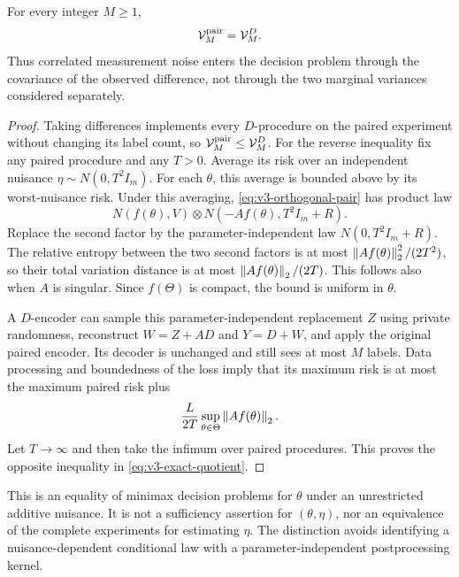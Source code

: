 \begin{theorem}
\label{thm:v3-quotient}
For every integer $M\ge1$,
\begin{equation}\label{eq:v3-exact-quotient}
 \mathcal V_M^{\rm pair}=\mathcal V_M^D.
\end{equation}
Thus correlated measurement noise enters the decision problem through the
covariance of the observed difference, not through the two marginal
variances considered separately.
\end{theorem}
\begin{proof}
Taking differences implements every $D$-procedure on the paired experiment
without changing its label count, so
$\mathcal V_M^{\rm pair}\le\mathcal V_M^D$.
For the reverse inequality fix any paired procedure and any $T>0$.
Average its risk over an independent nuisance
$\eta\sim N(0,T^2I_m)$. For each $\theta$, this average is bounded
above by its worst-nuisance risk. Under this averaging,
\eqref{eq:v3-orthogonal-pair} has product law
\[
 N(f(\theta),V)\otimes N(-Af(\theta),T^2I_m+R).
\]
Replace the second factor by the parameter-independent law
$N(0,T^2I_m+R)$. The relative entropy between the two second factors
is at most $\left\lVert Af(\theta)\right\rVert_2^2/(2T^2)$, so their total variation
distance is at most $\left\lVert Af(\theta)\right\rVert_2/(2T)$. This follows also
when $A$ is singular. Since $f(\Theta)$ is compact, the bound is
uniform in $\theta$.

A $D$-encoder can sample this parameter-independent replacement $Z$
using private randomness, reconstruct $W=Z+AD$ and $Y=D+W$, and apply
the original paired encoder. Its decoder is unchanged and still sees
at most $M$ labels. Data processing and boundedness of the loss imply
that its maximum risk is at most the maximum paired risk plus
\[
 \frac L{2T}\sup_{\theta\in\Theta}\left\lVert Af(\theta)\right\rVert_2.
\]
Let $T\to\infty$ and then take the infimum over paired procedures.
This proves the opposite inequality in \eqref{eq:v3-exact-quotient}.
\end{proof}

This is an equality of minimax decision problems for $\theta$ under an
unrestricted additive nuisance. It is not a sufficiency assertion for
$(\theta,\eta)$, nor an equivalence of the complete experiments for
estimating $\eta$. The distinction avoids identifying a nuisance-dependent
conditional law with a parameter-independent postprocessing kernel.

